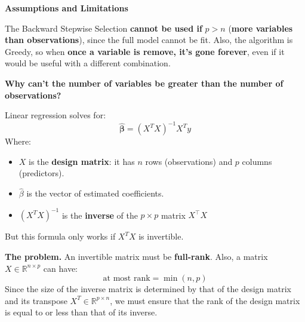 \highspace
\begin{flushleft}
    \textcolor{Red2}{ \textbf{Assumptions and Limitations}}
\end{flushleft}
The Backward Stepwise Selection \textbf{cannot be used if} $p > n$ (\textbf{more variables than observations}), since the full model cannot be fit. Also, the algorithm is Greedy, so when \textbf{once a variable is remove, it's gone forever}, even if it would be useful with a different combination.

\newpage

\begin{flushleft}
    \textcolor{Green3}{ \textbf{Why can't the number of variables be greater than the number of observations?}}
\end{flushleft}
Linear regression solves for:
\begin{equation*}
    \boldsymbol{\hat{\beta}} = \left(X^{T} X\right)^{-1} X^{T} y
\end{equation*}
Where:
\begin{itemize}
    \item $X$ is the \textbf{design matrix}: it has $n$ rows (observations) and $p$ columns (predictors).
    \item $\hat{\beta}$ is the vector of estimated coefficients.
    \item $\left(X^{T} X\right)^{-1}$ is the \textbf{inverse} of the $p \times p$ matrix $X^\top X$
\end{itemize}
But this formula only works if $X^{T} X$ is invertible.

\highspace
\textcolor{Red2}{ \textbf{The problem.}} An invertible matrix must be \textbf{full-rank}. Also, a matrix $X \in \mathbb{R}^{n \times p}$ can have:
\begin{equation*}
    \text{at most rank} = \min\left(n, p\right)
\end{equation*}
Since the size of the inverse matrix is determined by that of the design matrix and its transpose $X^T \in \mathbb{R}^{p \times n}$, we must ensure that the rank of the design matrix is equal to or less than that of its inverse.

